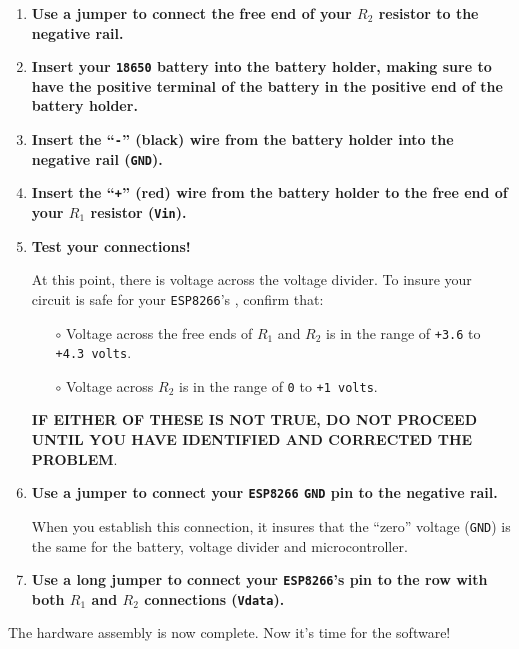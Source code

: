 \begin{enumerate}
	\item \textbf{Use a jumper to connect the free end of your $R_2$ resistor to the negative rail.}
	
	\item \textbf{Insert your \texttt{\texttt{18650}} battery into the battery holder, making sure to have the positive terminal of the battery in the positive end of the battery holder.}

	\item \textbf{Insert the ``\texttt{-}'' (black) wire from the battery holder into the negative rail  (\texttt{GND}).}

	\item \textbf{Insert the ``\texttt{+}'' (red) wire from the battery holder to the free end of your $R_1$ resistor  (\texttt{Vin}).}

	\item \textbf{Test your connections!}

	At this point, there is voltage across the voltage divider. 
	To insure your circuit is safe for your \texttt{ESP8266}'s \adc, confirm that: 
	\begin{itemize}
		\item[$\circ$] Voltage across the free ends of $R_1$ and $R_2$ is in the range of \texttt{+3.6} to \texttt{+4.3 volts}.
		\item[$\circ$] Voltage across $R_2$ is in the range of \texttt{0} to \texttt{+1 volts}.	
	\end{itemize}
	\textbf{IF EITHER OF THESE IS NOT TRUE, DO NOT PROCEED UNTIL YOU HAVE IDENTIFIED AND CORRECTED THE PROBLEM}.
	 
	\item \textbf{Use a jumper to connect your \texttt{ESP8266} \texttt{GND} pin to the negative rail.}
	 
	When you establish this connection, it insures that the ``zero'' voltage (\texttt{GND}) is the same for the battery, voltage divider and microcontroller.
	
	\item \textbf{Use a long jumper to connect your \texttt{ESP8266}'s \adc pin to the row with both $R_1$ and $R_2$ connections (\texttt{Vdata}).}
\end{enumerate}

	The hardware assembly is now complete.
	Now it's time for the software!
	
